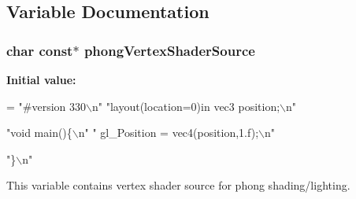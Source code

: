 \subsection{Variable Documentation}
\hypertarget{group__vs_gad2d377f5d5db8945bf16b9e9ca1b71a5}{
\subsubsection[{phong\-Vertex\-Shader\-Source}]{\setlength{\rightskip}{0pt plus 5cm}char const$\ast$ phong\-Vertex\-Shader\-Source}}\label{group__vs_gad2d377f5d5db8945bf16b9e9ca1b71a5}
{\bfseries Initial value\-:}
\begin{DoxyCode}
= 
\textcolor{stringliteral}{"#version 330\(\backslash\)n"}
\textcolor{stringliteral}{"layout(location=0)in vec3 position;\(\backslash\)n"}












\textcolor{stringliteral}{"void main()\{\(\backslash\)n"}
\textcolor{stringliteral}{"  gl\_Position = vec4(position,1.f);\(\backslash\)n"}










\textcolor{stringliteral}{"\}\(\backslash\)n"}
\end{DoxyCode}


This variable contains vertex shader source for phong shading/lighting. 

